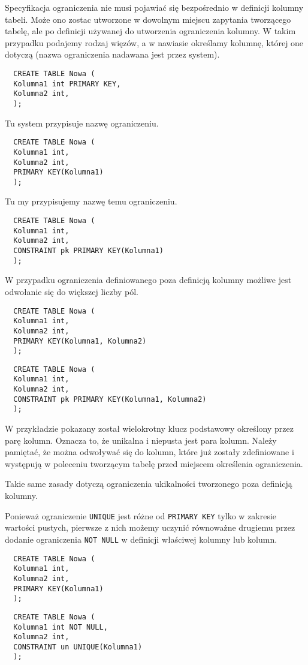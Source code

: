 \documentclass{article}
\begin{document}
Specyfikacja ograniczenia nie musi pojawiać się bezpośrednio w definicji kolumny tabeli. Może ono zostac utworzone w dowolnym miejscu zapytania tworzącego tabelę, ale po definicji używanej do utworzenia ograniczenia kolumny.
W takim przypadku podajemy rodzaj więzów, a w nawiasie określamy kolumnę, której one dotyczą (nazwa ograniczenia nadawana jest przez system).

\begin{verbatim}
  CREATE TABLE Nowa (
  Kolumna1 int PRIMARY KEY,
  Kolumna2 int,
  );
\end{verbatim}

Tu system przypisuje nazwę ograniczeniu.

\begin{verbatim}
  CREATE TABLE Nowa (
  Kolumna1 int,
  Kolumna2 int,
  PRIMARY KEY(Kolumna1)
  );
\end{verbatim}

Tu my przypisujemy nazwę temu ograniczeniu.

\begin{verbatim}
  CREATE TABLE Nowa (
  Kolumna1 int,
  Kolumna2 int,
  CONSTRAINT pk PRIMARY KEY(Kolumna1)
  );
\end{verbatim}

W przypadku ograniczenia definiowanego poza definicją kolumny możliwe jest odwołanie się do większej liczby pól.

\begin{verbatim}
  CREATE TABLE Nowa (
  Kolumna1 int,
  Kolumna2 int,
  PRIMARY KEY(Kolumna1, Kolumna2)
  );
\end{verbatim}

\begin{verbatim}
  CREATE TABLE Nowa (
  Kolumna1 int,
  Kolumna2 int,
  CONSTRAINT pk PRIMARY KEY(Kolumna1, Kolumna2)
  );
\end{verbatim}

W przykładzie pokazany został wielokrotny klucz podstawowy określony przez parę kolumn. Oznacza to, że unikalna i niepusta jest para kolumn.
Należy pamiętać, że można odwoływać się do kolumn, które już zostały zdefiniowane i występują w poleceniu tworzącym tabelę przed miejscem określenia ograniczenia.

Takie same zasady dotyczą ograniczenia ukikalności tworzonego poza definicją kolumny.

Ponieważ ograniczenie {\tt UNIQUE} jest różne od {\tt PRIMARY KEY} tylko w zakresie wartości pustych, pierwsze z nich możemy uczynić równoważne drugiemu przez dodanie ograniczenia {\tt NOT NULL} w definicji właściwej kolumny lub kolumn.

\begin{verbatim}
  CREATE TABLE Nowa (
  Kolumna1 int,
  Kolumna2 int,
  PRIMARY KEY(Kolumna1)
  );
\end{verbatim}

\begin{verbatim}
  CREATE TABLE Nowa (
  Kolumna1 int NOT NULL,
  Kolumna2 int,
  CONSTRAINT un UNIQUE(Kolumna1)
  );
\end{verbatim}
\end{document}
